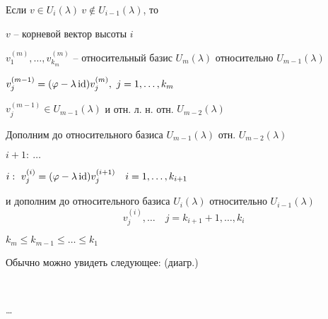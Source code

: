    \begin{definition}
        Если $v \in U_i(\lambda) \ v \not \in U_{i-1}(\lambda)$, то
        \par \quad $v$ -- корневой вектор высоты $i$
        \par \quad $v_1^{(m)}, \dots, v_{k_m}^{(m)}$ -- относительный базис $U_m(\lambda)$ относительно $U_{m-1}(\lambda)$
        \par \quad $v_j^{(m-1)} = (\varphi - \lambda\operatorname{id})v_j^{(m)}, \ j = 1, \dots, k_m$
        \par \quad $v_j^{(m-1)} \in U_{m-1}(\lambda)$ и отн. л. н. отн. $U_{m-2}(\lambda)$
        \par \quad Дополним до относительного базиса $U_{m-1}(\lambda)$ отн. $U_{m-2}(\lambda)$
    \end{definition}

    \par {}

    \par $i+1: \ \dots$
    \par $i: \ v_j^{(i)} = (\varphi - \lambda\operatorname{id})v_j^{(i+1)} \quad i = 1, \dots, k_{i+1}$
    \par \quad и дополним до относительного базиса $U_i(\lambda)$ относительно $U_{i-1}(\lambda)$
    \[
        v_j^{(i)}, \dots \quad j = k_{i+1} + 1, \dots, k_i
    \]

    \par $k_m \le k_{m-1} \le \dots \le k_1$
    \par Обычно можно увидеть следующее: (диагр.)
    \par
    \begin{tabular}{ | c | c | c |}
        \hline
         & &  \\
        \hline
    \end{tabular} \par
    \begin{tabular}{ | c | c | c | c |}
        \hline
         & & & \\
        \hline
    \end{tabular} \par
    \dots \par
    \begin{tabular}{ | c | c | c | c | c | c | c | c | c | c |}
        \hline
         & & & & & & & & &\\
        \hline
    \end{tabular} \par
    \begin{tabular}{ | c | c | c | c | c | c | c | c | c | c | c |}
        \hline
         & & & & & & & & & &\\
        \hline
    \end{tabular}

